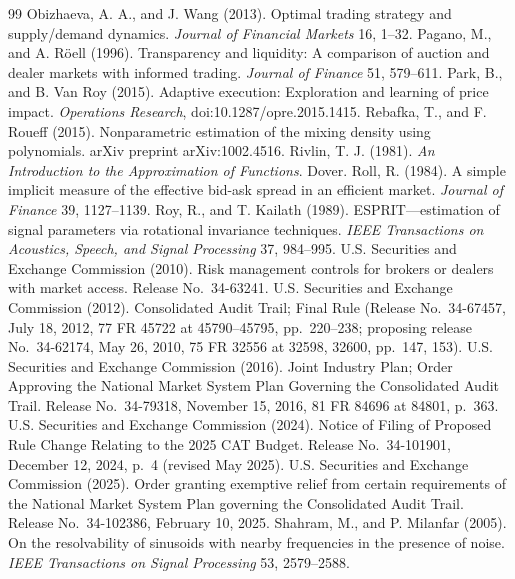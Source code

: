 \begin{thebibliography}{99}
 Obizhaeva, A. A., and J. Wang (2013). Optimal trading strategy and supply/demand dynamics. \emph{Journal of Financial Markets} 16, 1--32.
 Pagano, M., and A. R\"oell (1996). Transparency and liquidity: A comparison of auction and dealer markets with informed trading. \emph{Journal of Finance} 51, 579--611.
 Park, B., and B. Van Roy (2015). Adaptive execution: Exploration and learning of price impact. \emph{Operations Research}, doi:10.1287/opre.2015.1415.
 Rebafka, T., and F. Roueff (2015). Nonparametric estimation of the mixing density using polynomials. arXiv preprint arXiv:1002.4516.
 Rivlin, T. J. (1981). \emph{An Introduction to the Approximation of Functions}. Dover.
 Roll, R. (1984). A simple implicit measure of the effective bid-ask spread in an efficient market. \emph{Journal of Finance} 39, 1127--1139.
 Roy, R., and T. Kailath (1989). ESPRIT---estimation of signal parameters via rotational invariance techniques. \emph{IEEE Transactions on Acoustics, Speech, and Signal Processing} 37, 984--995.
 U.S. Securities and Exchange Commission (2010). Risk management controls for brokers or dealers with market access. Release No.\ 34-63241.
 U.S. Securities and Exchange Commission (2012). Consolidated Audit Trail; Final Rule (Release No.\ 34-67457, July 18, 2012, 77 FR 45722 at 45790--45795, pp.\ 220--238; proposing release No.\ 34-62174, May 26, 2010, 75 FR 32556 at 32598, 32600, pp.\ 147, 153).
 U.S. Securities and Exchange Commission (2016). Joint Industry Plan; Order Approving the National Market System Plan Governing the Consolidated Audit Trail. Release No.\ 34-79318, November 15, 2016, 81 FR 84696 at 84801, p.\ 363.
 U.S. Securities and Exchange Commission (2024). Notice of Filing of Proposed Rule Change Relating to the 2025 CAT Budget. Release No.\ 34-101901, December 12, 2024, p.\ 4 (revised May 2025).
 U.S. Securities and Exchange Commission (2025). Order granting exemptive relief from certain requirements of the National Market System Plan governing the Consolidated Audit Trail. Release No.\ 34-102386, February 10, 2025.
 Shahram, M., and P. Milanfar (2005). On the resolvability of sinusoids with nearby frequencies in the presence of noise. \emph{IEEE Transactions on Signal Processing} 53, 2579--2588.

\end{thebibliography}
